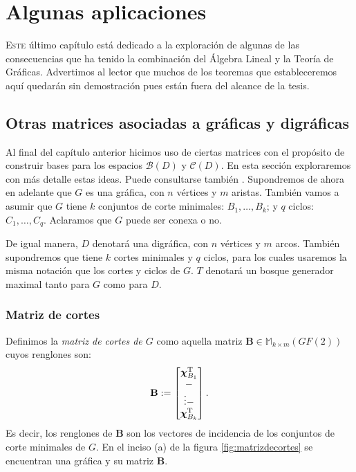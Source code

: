 \chapter{Algunas aplicaciones}

\lettrine [lines=5] {\initfamily \selectfont E} {ste} último capítulo está dedicado a la exploración de algunas de las consecuencias que ha tenido la combinación del Álgebra Lineal y la Teoría de Gráficas. Advertimos al lector que muchos de los teoremas que estableceremos aquí quedarán sin demostración pues están fuera del alcance de la tesis. 


\section{Otras matrices asociadas a gráficas y digráficas}
Al final del capítulo anterior hicimos uso de ciertas matrices con el propósito de construir bases para los espacios $\mathcal{B}(D)$ y $\mathcal{C}(D)$. En esta sección exploraremos con más detalle estas ideas. Puede consultarse también \cite{Deo,Seshu,Gross}. Supondremos de ahora en adelante que $G$ es una gráfica, con $n$ vértices y $m$ aristas. También vamos a asumir que $G$ tiene $k$ conjuntos de corte minimales: $B_{1}, \ldots, B_{k}$; y $q$ ciclos: $C_{1},\ldots, C_{q}$. Aclaramos que $G$ puede ser conexa o no. 

De igual manera, $D$ denotará una digráfica, con $n$ vértices y $m$ arcos. También supondremos que tiene $k$ cortes minimales y $q$ ciclos, para los cuales usaremos la misma notación que los cortes y ciclos de $G$. $T$ denotará un bosque generador maximal tanto para $G$ como para $D$.

\subsection{Matriz de cortes}
 Definimos la \textit{matriz de cortes de $G$} como aquella matriz $\mathbf{B} \in \mathbb{M}_{k \times m}(GF(2))$ cuyos renglones son:
$$
\mathbf{B}:= \begin{bmatrix} 
\boldsymbol{\chi}_{B_{1}}^{\textnormal{T}} \\
\-- \\
\vdots
\-- \\
\boldsymbol{\chi}_{B_{k}}^{\textnormal{T}}
\end{bmatrix}.
$$
 Es decir, los renglones de $\mathbf{B}$ son los vectores de incidencia de los conjuntos de corte minimales de $G$. En el inciso (a) de la figura \ref{fig:matrizdecortes} se encuentran una gráfica y su matriz $\mathbf{B}$.
 
